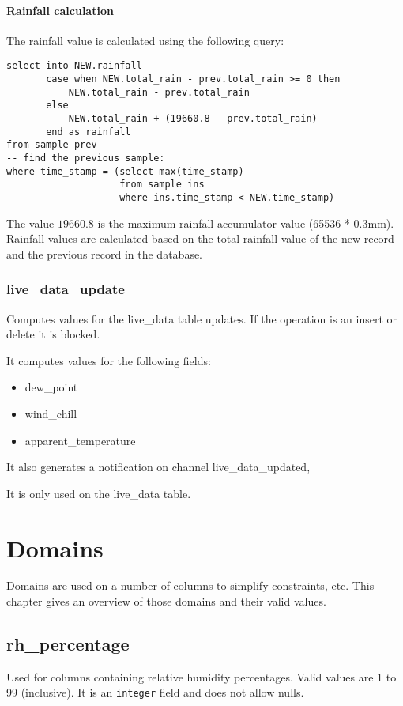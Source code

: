 \documentclass[a4paper,10pt]{book}
\begin{document}
\subsubsection{Rainfall calculation}
The rainfall value is calculated using the following query:

\lstset{
  language=SQL,
  frame=single,
  numbers=left,
  basicstyle=\small,
  commentstyle=\emph
}

\begin{lstlisting}
select into NEW.rainfall
       case when NEW.total_rain - prev.total_rain >= 0 then
           NEW.total_rain - prev.total_rain
       else
           NEW.total_rain + (19660.8 - prev.total_rain)
       end as rainfall
from sample prev
-- find the previous sample:
where time_stamp = (select max(time_stamp)
                    from sample ins
                    where ins.time_stamp < NEW.time_stamp)
\end{lstlisting}

The value $19660.8$ is the maximum rainfall accumulator value (65536 * 0.3mm). Rainfall values are calculated based on the total rainfall value of the new record and the previous record in the database.


\subsection{live\_data\_update}
Computes values for the live\_data table updates. If the operation is an
insert or delete it is blocked.

It computes values for the following fields:
\begin{itemize}
\item dew\_point
\item wind\_chill
\item apparent\_temperature
\end{itemize}

It also generates a notification on channel live\_data\_updated,

It is only used on the live\_data table.

\chapter{Domains}
\label{cha_domains}

Domains are used on a number of columns to simplify constraints, etc. This chapter gives an overview of those domains and their valid values.

\section{rh\_percentage}
\label{rh_percentage}
Used for columns containing relative humidity percentages. Valid values are 1 to 99 (inclusive). It is an \verb|integer| field and does not allow nulls.
\end{document}
